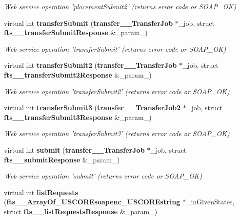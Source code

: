 \begin{DoxyCompactItemize}
\begin{DoxyCompactList}\small\item\em Web service operation 'placementSubmit2' (returns error code or SOAP\_\-OK) \item\end{DoxyCompactList}\item 
virtual int {\bf transferSubmit} ({\bf transfer\_\-\_\-TransferJob} $\ast$\_\-job, struct {\bf fts\_\-\_\-transferSubmitResponse} \&\_\-param\_)\label{classFileTransferSoapBindingProxy_a4a5d6b9e5d79847a62765aa43badd170}

\begin{DoxyCompactList}\small\item\em Web service operation 'transferSubmit' (returns error code or SOAP\_\-OK) \item\end{DoxyCompactList}\item 
virtual int {\bf transferSubmit2} ({\bf transfer\_\-\_\-TransferJob} $\ast$\_\-job, struct {\bf fts\_\-\_\-transferSubmit2Response} \&\_\-param\_)\label{classFileTransferSoapBindingProxy_a9ca95039536d47a3185623b91d1c46d9}

\begin{DoxyCompactList}\small\item\em Web service operation 'transferSubmit2' (returns error code or SOAP\_\-OK) \item\end{DoxyCompactList}\item 
virtual int {\bf transferSubmit3} ({\bf transfer\_\-\_\-TransferJob2} $\ast$\_\-job, struct {\bf fts\_\-\_\-transferSubmit3Response} \&\_\-param\_)\label{classFileTransferSoapBindingProxy_abd61ae0a80ec18990c0e0cca97e87817}

\begin{DoxyCompactList}\small\item\em Web service operation 'transferSubmit3' (returns error code or SOAP\_\-OK) \item\end{DoxyCompactList}\item 
virtual int {\bf submit} ({\bf transfer\_\-\_\-TransferJob} $\ast$\_\-job, struct {\bf fts\_\-\_\-submitResponse} \&\_\-param\_)\label{classFileTransferSoapBindingProxy_ad49e19443c157698ec08f89f8da9ed77}

\begin{DoxyCompactList}\small\item\em Web service operation 'submit' (returns error code or SOAP\_\-OK) \item\end{DoxyCompactList}\item 
virtual int {\bf listRequests} ({\bf fts\_\-\_\-ArrayOf\_\-USCOREsoapenc\_\-USCOREstring} $\ast$\_\-inGivenStates, struct {\bf fts\_\-\_\-listRequestsResponse} \&\_\-param\_)\label{classFileTransferSoapBindingProxy_aa7ae039d5f382180dc9b0dcfb24c2828}


\end{DoxyCompactItemize}
